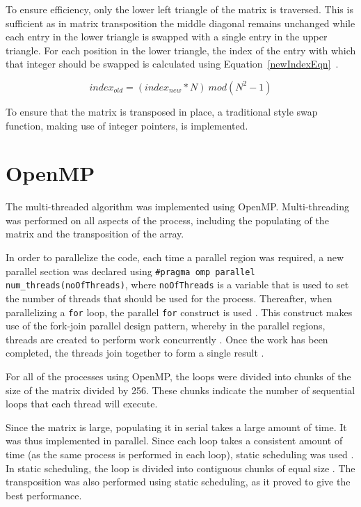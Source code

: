 \documentclass[10pt,twocolumn]{witseiepaper}
\begin{document}
To ensure efficiency, only the lower left triangle of the matrix is traversed. This is sufficient as in matrix transposition the middle diagonal remains unchanged while each entry in the lower triangle is swapped with a single entry in the upper triangle. For each position in the lower triangle, the index of the entry with which that integer should be swapped is calculated using Equation~\ref{newIndexEqn}~\cite{inPlaceTranspose}.

\begin{equation}
\label{newIndexEqn}
index_{old} = (index_{new}*N)~mod(N^2-1)
\end{equation}

To ensure that the matrix is transposed in place, a traditional style swap function, making use of integer pointers, is implemented.

\section{OpenMP}
The multi-threaded algorithm was implemented using OpenMP. Multi-threading was performed on all aspects of the process, including the populating of the matrix and the transposition of the array. 

In order to parallelize the code, each time a parallel region was required, a new parallel section was declared using \texttt{\#pragma omp parallel num\_threads(noOfThreads)}, where \texttt{noOfThreads} is a variable that is used to set the number of threads that should be used for the process. Thereafter, when parallelizing a \texttt{for} loop, the parallel \texttt{for} construct is used \cite{openMP}. This construct makes use of the fork-join parallel design pattern, whereby in the parallel regions, threads are created to perform work concurrently \cite{openMP}. Once the work has been completed, the threads join together to form a single result \cite{openMP}.

For all of the processes using OpenMP, the loops were divided into chunks of the size of the matrix divided by 256. These chunks indicate the number of sequential loops that each thread will execute.

Since the matrix is large, populating it in serial takes a large amount of time. It was thus implemented in parallel. Since each loop takes a consistent amount of time (as the same process is performed in each loop), static scheduling was used \cite{HPC}. In static scheduling, the loop is divided into contiguous chunks of equal size \cite{HPC}. The transposition was also performed using static scheduling, as it proved to give the best performance. 
\end{document}
